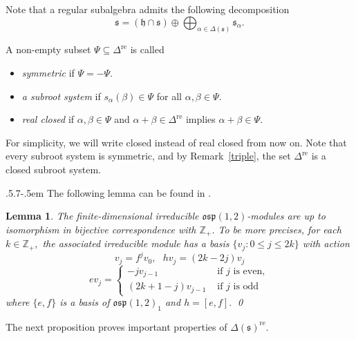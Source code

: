 \documentclass[11pt,reqno]{amsart}
\makeatletter
\theoremstyle{plain}
\newtheorem*{lemma}{Lemma}
\theoremstyle{definition}
\theoremstyle{remark}
\newcommand{\lie}[1]{\mathfrak{#1}}
\newcommand\bz{\mathbb Z}
\numberwithin{equation}{section}
\def\subsection{\def\@secnumfont{\bfseries}\@startsection{subsection}{2}%
  {\parindent}{.5\linespacing\@plus.7\linespacing}{-.5em}%
  {\normalfont\bfseries}}
\makeatother
\begin{document}
Note that a regular subalgebra admits the following decomposition
$$\lie{s}=(\lie h\cap \lie s)\oplus \bigoplus_{\alpha\in \Delta(\lie s)}\lie{s}_\alpha.$$ 

A non-empty subset $\Psi\subseteq \Delta^{\mathrm{re}}$ is called 
\begin{itemize}
\item \textit{ symmetric} if $\Psi=-\Psi$.\vspace{0,2cm}

    \item \textit{ a subroot system} if $s_{\alpha}(\beta)\in \Psi$ for all $\alpha,\beta\in \Psi$.\vspace{0,2cm}
       
    \item \textit{ real closed} if $\alpha,\beta\in \Psi$ and $\alpha+\beta\in \Delta^{\mathrm{re}}$ implies $\alpha+\beta\in \Psi.$\vspace{0,2cm}
\end{itemize}
For simplicity, we will write closed instead of real closed from now on. Note that every subroot system is symmetric, and by Remark~\ref{triple}, the set $\Delta^{\mathrm{re}}$ is a closed subroot system.

\subsection{} The following lemma can be found in \cite[Lemma 1.94]{Wa01}. 

\begin{lemma}\label{osp}
   The finite-dimensional irreducible $\lie{osp}(1,2)$-modules are up to isomorphism in bijective correspondence with $\bz_+$. To be more precises, for each $k\in\bz_+,$ the associated irreducible module has a basis $\{v_j: 0\le j\le 2k\}$ with action 
    $$v_j=f^jv_0,\ \ \ hv_j=(2k-2j)v_j$$
    $$ev_{j}=\begin{cases}
        -jv_{j-1} &\text{ if $j$ is even},\\
        (2k+1-j)v_{j-1} &\text{ if $j$ is odd}
    \end{cases}$$
   where $\{e,f\}$ is a basis of $\lie{osp}(1,2)_1$ and $h=[e,f].$
\qed
\end{lemma}
The next proposition proves important properties of $\Delta(\lie s)^{\mathrm{re}}$.
\end{document}
